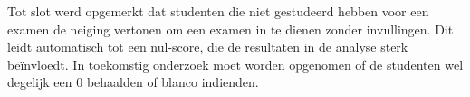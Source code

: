 \documentclass{hogent-article}
\begin{document}
Tot slot werd opgemerkt dat studenten die niet gestudeerd hebben voor een examen de neiging vertonen om een examen in te dienen zonder invullingen. Dit leidt automatisch tot een nul-score, die de resultaten in de analyse sterk beïnvloedt. In toekomstig onderzoek moet worden opgenomen of de studenten wel degelijk een 0 behaalden of blanco indienden.


\printbibliography[heading=bibintoc]
\end{document}
